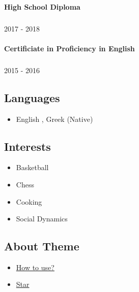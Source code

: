 \documentclass[english,]{article}
\providecommand{\tightlist}{%
  \setlength{\itemsep}{0pt}\setlength{\parskip}{0pt}}
\let\oldparagraph\paragraph
\renewcommand{\paragraph}[1]{\oldparagraph{#1}\mbox{}}
\let\oldsubparagraph\subparagraph
\renewcommand{\subparagraph}[1]{\oldsubparagraph{#1}\mbox{}}
\begin{document}
\hypertarget{high-school-diploma}{%
\paragraph{High School Diploma}\label{high-school-diploma}}

\hypertarget{section}{%
\subparagraph{}\label{section}}

2017 - 2018

\hypertarget{certificiate-in-proficiency-in-english}{%
\paragraph{Certificiate in Proficiency in
English}\label{certificiate-in-proficiency-in-english}}

\hypertarget{section-1}{%
\subparagraph{}\label{section-1}}

2015 - 2016

\hypertarget{languages}{%
\subsection{Languages}\label{languages}}

\begin{itemize}
\tightlist
\item
  English , Greek {(Native)}
\end{itemize}

\hypertarget{interests}{%
\subsection{Interests}\label{interests}}

\begin{itemize}
\tightlist
\item
  Basketball
\item
  Chess
\item
  Cooking
\item
  Social Dynamics
\end{itemize}

\hypertarget{about-theme}{%
\subsection{About Theme}\label{about-theme}}

\begin{itemize}
\tightlist
\item
  \href{https://www.youtube.com/watch?v=Jnmj1dXDbNk}{How to use?}
\item
  \href{https://github.com/sharu725/online-cv}{Star}
\end{itemize}
\end{document}

